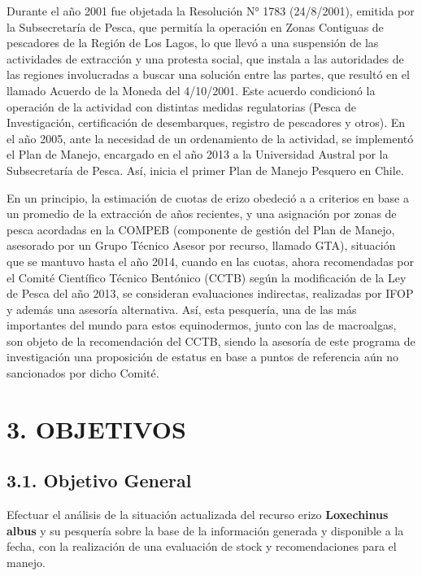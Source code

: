 \documentclass[
]{article}
\begin{document}
Durante el año 2001 fue objetada la Resolución N° 1783 (24/8/2001),
emitida por la Subsecretaría de Pesca, que permitía la operación en
Zonas Contiguas de pescadores de la Región de Los Lagos, lo que llevó a
una suspensión de las actividades de extracción y una protesta social,
que instala a las autoridades de las regiones involucradas a buscar una
solución entre las partes, que resultó en el llamado Acuerdo de la
Moneda del 4/10/2001. Este acuerdo condicionó la operación de la
actividad con distintas medidas regulatorias (Pesca de Investigación,
certificación de desembarques, registro de pescadores y otros). En el
año 2005, ante la necesidad de un ordenamiento de la actividad, se
implementó el Plan de Manejo, encargado en el año 2013 a la Universidad
Austral por la Subsecretaría de Pesca. Así, inicia el primer Plan de
Manejo Pesquero en Chile.

En un principio, la estimación de cuotas de erizo obedeció a a criterios
en base a un promedio de la extracción de años recientes, y una
asignación por zonas de pesca acordadas en la COMPEB (componente de
gestión del Plan de Manejo, asesorado por un Grupo Técnico Asesor por
recurso, llamado GTA), situación que se mantuvo hasta el año 2014,
cuando en las cuotas, ahora recomendadas por el Comité Científico
Técnico Bentónico (CCTB) según la modificación de la Ley de Pesca del
año 2013, se consideran evaluaciones indirectas, realizadas por IFOP y
además una asesoría alternativa. Así, esta pesquería, una de las más
importantes del mundo para estos equinodermos, junto con las de
macroalgas, son objeto de la recomendación del CCTB, siendo la asesoría
de este programa de investigación una proposición de estatus en base a
puntos de referencia aún no sancionados por dicho Comité.

\pagebreak

\hypertarget{objetivos}{%
\section{3. OBJETIVOS}\label{objetivos}}

\hypertarget{objetivo-general}{%
\subsection{3.1. Objetivo General}\label{objetivo-general}}

Efectuar el análisis de la situación actualizada del recurso erizo
\textbf{Loxechinus albus} y su pesquería sobre la base de la información
generada y disponible a la fecha, con la realización de una evaluación
de stock y recomendaciones para el manejo.
\end{document}
